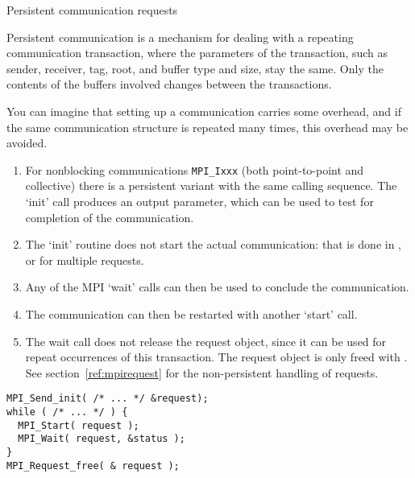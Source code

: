 
 {Persistent communication requests}
\label{sec:persistent}

Persistent communication is a mechanism for dealing
with a repeating communication transaction,
where the parameters of the transaction,
such as sender, receiver, tag, root, and buffer type and size,
stay the same.
Only the contents of the buffers involved changes between the transactions.

You can imagine that setting up a communication
carries some overhead, and if the same communication structure
is repeated many times, this overhead may be avoided.

\begin{enumerate}
\item
  For nonblocking communications \lstinline{MPI_Ixxx}
  (both point-to-point and collective)
  there is a persistent variant 
  with the same calling sequence.
  The `init' call produces
  an  output parameter,
  which can be used to test for completion of the communication.
\item 
  The `init' routine does not start the actual communication:
  that is done in
  ,
  or  for multiple requests.
\item Any of the MPI `wait' calls can then be used
  to conclude the communication.
\item The communication can then be restarted with another `start' call.
\item The wait call does not release the request object,
  since it can be used for repeat occurrences of this transaction.
  The request object is only freed with .
  See section~\ref{ref:mpirequest} for the non-persistent handling of requests.
\end{enumerate}

\begin{lstlisting}
MPI_Send_init( /* ... */ &request);
while ( /* ... */ ) {
  MPI_Start( request );
  MPI_Wait( request, &status );
}
MPI_Request_free( & request );
\end{lstlisting}

